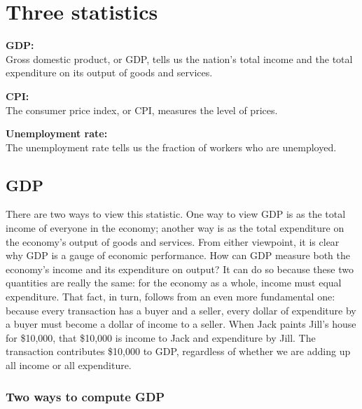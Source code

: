\documentclass[12pt]{article}
\title{}
\author{}
\date{}
\begin{document}
\maketitle
\section{Three statistics}
{\textbf {GDP:}}\\
Gross domestic product, or GDP, tells us the nation’s total income and the total 
expenditure on its output of goods and services.

{\textbf {CPI:}}\\
The consumer price index, or CPI, measures the level of prices. 

{\textbf {Unemployment rate:}}\\
The unemployment rate tells us the fraction of workers who are unemployed. 



\subsection{GDP}
There are two ways to view this statistic. 
One way to view GDP is as the total income of everyone in the
economy; another way is as the total expenditure on the economy’s output of goods 
and services. From either viewpoint, it is clear why GDP is a gauge of economic 
performance. How can GDP measure both the economy’s income and its expenditure on output?
It can do so because these two quantities are really the same: for the economy as 
a whole, income must equal expenditure. That fact, in turn, follows from an even more
fundamental one: because every transaction has a buyer and a seller,
every dollar of expenditure by a buyer must become a dollar of income to a seller. 
When Jack paints Jill’s house for \$10,000, that \$10,000 is income to Jack and 
expenditure by Jill. The transaction contributes \$10,000 to GDP, regardless of whether 
we are adding up all income or all expenditure.



\subsubsection{Two ways to compute GDP}
\end{document}
